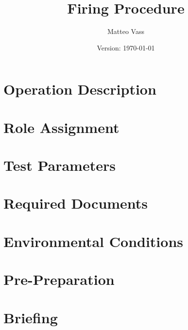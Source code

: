 \documentclass{article}
\title{Firing Procedure}
\author{Matteo Vass}
\date{Version: \isodate\today}
\begin{document}
\maketitle

\thispagestyle{fancy}

\renewcommand{\thesection}{\Alph{section}}

\section{Operation Description}


\section{Role Assignment}


\section{Test Parameters}


\section{Required Documents}


\section{Environmental Conditions}


\newpage

\renewcommand{\thesection}{\arabic{section}}

\setcounter{section}{0}

\section{Pre-Preparation}


\section{Briefing}

\end{document}
